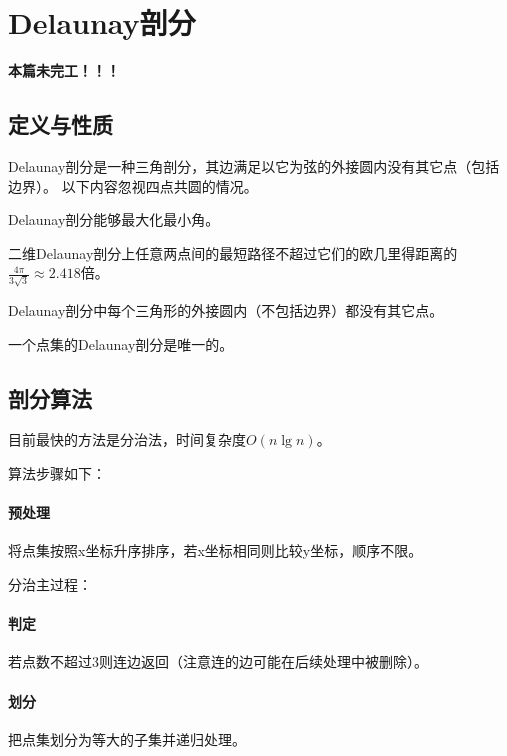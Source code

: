\section{Delaunay剖分}
{\bfseries 本篇未完工！！！}
\subsection{定义与性质}
Delaunay剖分是一种三角剖分，其边满足以它为弦的外接圆内没有其它点（包括边界）。
以下内容忽视四点共圆的情况。

\begin{property}
   Delaunay剖分能够最大化最小角。
\end{property}

\begin{property}
   二维Delaunay剖分上任意两点间的最短路径不超过它们的欧几里得距离的
   $\frac{4\pi}{3\sqrt{3}}\approx 2.418$倍。
\end{property}

\begin{property}
    Delaunay剖分中每个三角形的外接圆内（不包括边界）都没有其它点。
\end{property}

\begin{property}
    一个点集的Delaunay剖分是唯一的。
\end{property}

\subsection{剖分算法}
目前最快的方法是分治法，时间复杂度$O(n\lg n)$。

算法步骤如下：

\paragraph{预处理} 将点集按照x坐标升序排序，若x坐标相同则比较y坐标，顺序不限。

分治主过程：

\paragraph{判定}若点数不超过3则连边返回（注意连的边可能在后续处理中被删除）。

\paragraph{划分}把点集划分为等大的子集并递归处理。


